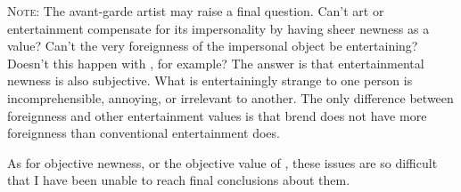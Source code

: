 \vfill

\textsc{Note:} The avant-garde artist may raise a final question. Can't art or entertainment compensate for its impersonality by having sheer newness as a value? Can't the very foreignness of the impersonal object be entertaining? Doesn't this happen with , for example? The answer is that entertainmental newness is also subjective. What is entertainingly strange to one person is incomprehensible, annoying, or irrelevant to another. The only difference between foreignness and other entertainment values is that brend does not have more foreignness than conventional entertainment does. 

As for objective newness, or the objective value of , these issues are so difficult that I have been unable to reach final conclusions about them. 

